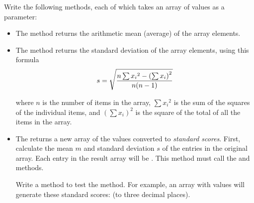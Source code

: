 \begin{exercise}
\label{ex:standardize}
Write the following methods, each of which takes an array of  values as a parameter:

\begin{itemize}
\item The  method returns the arithmetic mean (average) of the array elements.

\item The  method returns the standard deviation of the array elements, using this formula
\begin{equation*}
s = \sqrt {{n \sum{x_i} ^2 - \left(\sum{x_i}\right)^2} \over {n (n - 1)}}
\end{equation*}

where $n$ is the number of items in the array, $\sum{x_i} ^2$ is the sum of the squares of the individual items, and $\left(\sum{x_i}\right)^2$ is the square of the total of all the items in the array.

\item The  returns a new array of the values converted to {\em standard scores}. First, calculate the mean $m$ and standard deviation $s$ of the entries in the original array. Each entry in the result array will be . This method must call the  and  methods.

Write a  method to test the  method. For example, an array with values
 will generate these standard scores:  (to three decimal places). 

\end{itemize}
\end{exercise}

